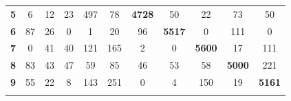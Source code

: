 \documentclass[
	12pt,				%
	openright,			%
	twoside,			%
	a4paper,			%
	english,			%
	brazil,				%
	svgnames
	]{abntex2}\usepackage[]{graphicx}\usepackage[]{color}
\begin{document}
\begin{table}[h]
\begin{tabular}{rcccccccccc}
\multicolumn{1}{r|}{\textbf{5}}          & 6                                  & 12                                 & 23                                 & 497                                & \multicolumn{1}{c|}{78}            & \multicolumn{1}{c|}{\textbf{4728}} & 50                                 & 22                                 & 73                                 & 50                                 \\ \cline{7-8}
\multicolumn{1}{r|}{\textbf{6}}          & 87                                 & 26                                 & 0                                  & 1                                  & 20                                 & \multicolumn{1}{c|}{96}            & \multicolumn{1}{c|}{\textbf{5517}} & 0                                  & 111                                & 0                                  \\ \cline{8-9}
\multicolumn{1}{r|}{\textbf{7}}          & 0                                  & 41                                 & 40                                 & 121                                & 165                                & 2                                  & \multicolumn{1}{c|}{0}             & \multicolumn{1}{c|}{\textbf{5600}} & 17                                 & 111                                \\ \cline{9-10}
\multicolumn{1}{r|}{\textbf{8}}          & 83                                 & 43                                 & 47                                 & 59                                 & 85                                 & 46                                 & 53                                 & \multicolumn{1}{c|}{58}            & \multicolumn{1}{c|}{\textbf{5000}} & 221                                \\ \cline{10-11} 
\multicolumn{1}{r|}{\textbf{9}}          & 55                                 & 22                                 & 8                                  & 143                                & 251                                & 0                                  & 4                                  & 150                                & \multicolumn{1}{c|}{19}            & \multicolumn{1}{c|}{\textbf{5161}} \\ \hline
\textbf{}                                &                                    &                                    &                                    &                                    &                                    &                                    &                                    &                                    &                                    &                                    \\ \hline

\end{tabular}
\end{table}
\end{document}

